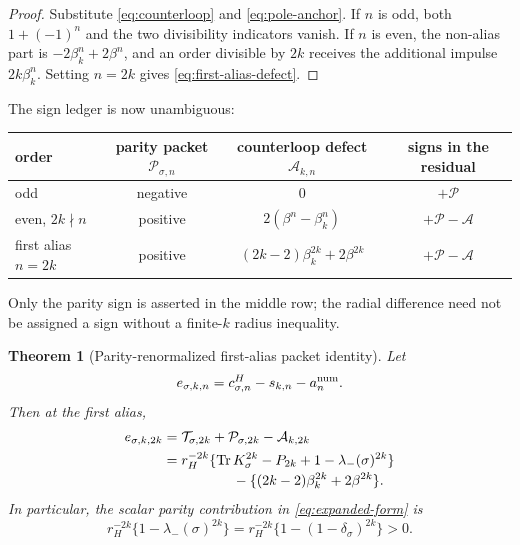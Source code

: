 \documentclass[11pt]{article}
\newtheorem{theorem}{Theorem}[section]
\theoremstyle{remark}
\newcommand{\Tr}{\operatorname{Tr}}
\newcommand{\1}{\mathbf 1}
\newcommand{\cA}{\mathcal A}
\newcommand{\cP}{\mathcal P}
\newcommand{\cT}{\mathcal T}
\begin{document}
\begin{proof}
Substitute \eqref{eq:counterloop} and \eqref{eq:pole-anchor}.  If $n$ is
odd, both $1+(-1)^n$ and the two divisibility indicators vanish.  If $n$ is
even, the non-alias part is $-2\beta_k^n+2\beta^n$, and an order divisible by
$2k$ receives the additional impulse $2k\beta_k^n$.  Setting $n=2k$ gives
\eqref{eq:first-alias-defect}.
\end{proof}

The sign ledger is now unambiguous:
\begin{center}\small
\begin{tabular}{lccc}
\toprule
order & parity packet $\cP_{\sigma,n}$
& counterloop defect $\cA_{k,n}$ & signs in the residual\\
\midrule
odd & negative & $0$ & $+\cP$\\
even, $2k\nmid n$ & positive
& $2(\beta^n-\beta_k^n)$ & $+\cP-\cA$\\
first alias $n=2k$ & positive
& $(2k-2)\beta_k^{2k}+2\beta^{2k}$ & $+\cP-\cA$\\
\bottomrule
\end{tabular}
\end{center}
Only the parity sign is asserted in the middle row; the radial difference
need not be assigned a sign without a finite-$k$ radius inequality.

\begin{theorem}[Parity-renormalized first-alias packet identity]
\label{thm:main-identity}
Let
\begin{equation}
 e_{\sigma,k,n}=c^H_{\sigma,n}-s_{k,n}-a_n^{\rm num}.
 \label{eq:error}
\end{equation}
Then at the first alias,
\begin{align}
 e_{\sigma,k,2k}
 &=\cT_{\sigma,2k}+\cP_{\sigma,2k}-\cA_{k,2k}
 \label{eq:packet-form}\\
 &=r_H^{-2k}\{\Tr K_\sigma^{2k}-P_{2k}
     +1-\lambda_-(\sigma)^{2k}\}
 \notag\\[-0.2em]
 &\hspace{5em}
 -\{(2k-2)\beta_k^{2k}+2\beta^{2k}\}.
 \label{eq:expanded-form}
\end{align}
In particular, the scalar parity contribution in \eqref{eq:expanded-form}
is
\begin{equation}
 r_H^{-2k}\{1-\lambda_-(\sigma)^{2k}\}
 =r_H^{-2k}\{1-(1-\delta_\sigma)^{2k}\}>0.
 \label{eq:positive-even-parity}
\end{equation}
\end{theorem}
\end{document}
